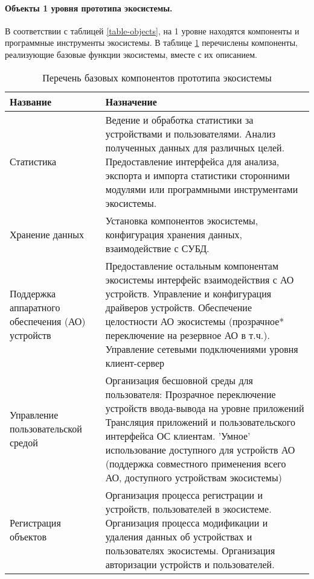 \paragraph*{Объекты 1 уровня прототипа экосистемы.}
В соответствии с таблицей \ref{table-objects}, на 1 уровне находятся компоненты и программные инструменты экосистемы. В таблице \ref{table-components} перечислены компоненты, реализующие базовые функции экосистемы, вместе с их описанием.
\begin{table}[ht]
   \centering
   \begin{tabularx}{\textwidth}{|>{\centering}p{}|X|}
      \cline{1-2}
      Название & Назначение \\
      \hline
      Статистика & Ведение и обработка статистики за устройствами и пользователями. Анализ полученных данных для различных целей. Предоставление интерфейса для анализа, экспорта и импорта статистики сторонними модулями или программными инструментами экосистемы. \\
      \hline
      Хранение данных & Установка компонентов экосистемы, конфигурация хранения данных, взаимодействие с СУБД. \\
      \hline
      Поддержка аппаратного обеспечения (АО) устройств & Предоставление остальным компонентам экосистемы интерфейс взаимодействия с АО устройств. Управление и конфигурация драйверов устройств. Обеспечение целостности АО экосистемы (прозрачное* переключение на резервное АО в т.ч.). Управление сетевыми подключениями уровня клиент-сервер \\
      \hline
      Управление пользовательской средой & Организация бесшовной среды для пользователя:
      Прозрачное переключение устройств ввода-вывода на уровне приложений
      Трансляция приложений и пользовательского интерфейса ОС клиентам.
      'Умное' использование доступного для устройств АО (поддержка совместного применения всего АО, доступного устройствам экосистемы) \\
      \hline
      Регистрация объектов & Организация процесса регистрации и устройств, пользователей в экосистеме. Организация процесса модификации и удаления данных об устройствах и пользователях экосистемы. Организация авторизации устройств и пользователей. \\
      \hline
   \end{tabularx}
   \caption{Перечень базовых компонентов прототипа экосистемы}
   \label{table-components}
\end{table}

